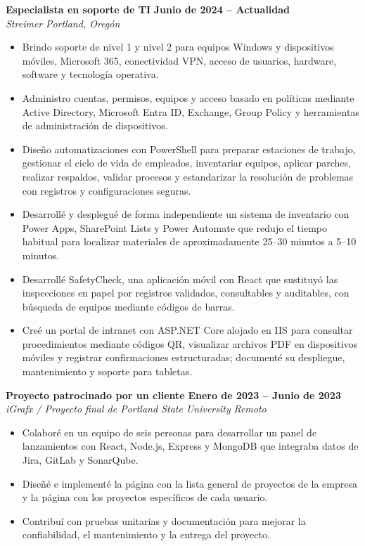 \documentclass[letterpaper,10pt]{article}
\newcommand{\role}[4]{%
  \textbf{#1} \hfill \textbf{#2}\\
  \textit{#3} \hfill \textit{#4}\vspace{2.5pt}
}
\begin{document}
\role{Especialista en soporte de TI}{Junio de 2024 -- Actualidad}{Streimer}{Portland, Oregón}
\begin{itemize}
  \item Brindo soporte de nivel 1 y nivel 2 para equipos Windows y dispositivos móviles, Microsoft 365, conectividad VPN, acceso de usuarios, hardware, software y tecnología operativa.
  \item Administro cuentas, permisos, equipos y acceso basado en políticas mediante Active Directory, Microsoft Entra ID, Exchange, Group Policy y herramientas de administración de dispositivos.
  \item Diseño automatizaciones con PowerShell para preparar estaciones de trabajo, gestionar el ciclo de vida de empleados, inventariar equipos, aplicar parches, realizar respaldos, validar procesos y estandarizar la resolución de problemas con registros y configuraciones seguras.
  \item Desarrollé y desplegué de forma independiente un sistema de inventario con Power Apps, SharePoint Lists y Power Automate que redujo el tiempo habitual para localizar materiales de aproximadamente 25--30 minutos a 5--10 minutos.
  \item Desarrollé SafetyCheck, una aplicación móvil con React que sustituyó las inspecciones en papel por registros validados, consultables y auditables, con búsqueda de equipos mediante códigos de barras.
  \item Creé un portal de intranet con ASP.NET Core alojado en IIS para consultar procedimientos mediante códigos QR, visualizar archivos PDF en dispositivos móviles y registrar confirmaciones estructuradas; documenté su despliegue, mantenimiento y soporte para tabletas.
\end{itemize}

\vspace{1pt}
\role{Proyecto patrocinado por un cliente}{Enero de 2023 -- Junio de 2023}{iGrafx / Proyecto final de Portland State University}{Remoto}
\begin{itemize}
  \item Colaboré en un equipo de seis personas para desarrollar un panel de lanzamientos con React, Node.js, Express y MongoDB que integraba datos de Jira, GitLab y SonarQube.
  \item Diseñé e implementé la página con la lista general de proyectos de la empresa y la página con los proyectos específicos de cada usuario.
  \item Contribuí con pruebas unitarias y documentación para mejorar la confiabilidad, el mantenimiento y la entrega del proyecto.
\end{itemize}
\end{document}
